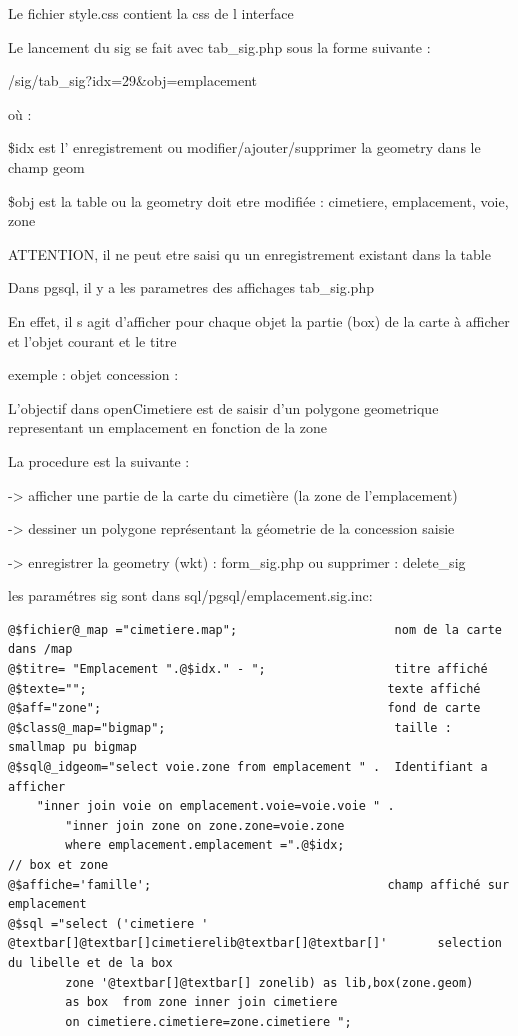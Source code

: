 \documentclass[letterpaper,10pt,french]{manual}
\begin{document}
Le fichier style.css contient la css de l interface

Le lancement du sig se fait avec tab\_sig.php sous la forme suivante :

/sig/tab\_sig?idx=29\&obj=emplacement

où :

\$idx est l' enregistrement ou modifier/ajouter/supprimer la geometry  dans le champ geom

\$obj est la table ou la geometry doit etre modifiée : cimetiere, emplacement, voie, zone

ATTENTION, il ne peut etre saisi qu un enregistrement existant dans la table

Dans pgsql, il y a les parametres des affichages tab\_sig.php

En effet, il s agit d'afficher pour chaque objet la partie (box) de la carte à afficher et
l'objet courant et le titre

exemple : objet concession :

L'objectif dans openCimetiere est de saisir d'un polygone geometrique
representant un emplacement en fonction de la zone

La procedure est la suivante :

-\textgreater{} afficher une partie de la carte du cimetière (la zone de l'emplacement)

-\textgreater{} dessiner un polygone représentant la géometrie de la concession saisie

-\textgreater{} enregistrer la geometry (wkt) : form\_sig.php ou supprimer : delete\_sig

les paramétres sig sont dans sql/pgsql/emplacement.sig.inc:

\begin{Verbatim}[commandchars=@\[\]]
@$fichier@_map ="cimetiere.map";                      nom de la carte dans /map
@$titre= "Emplacement ".@$idx." - ";                  titre affiché
@$texte="";                                          texte affiché
@$aff="zone";                                        fond de carte
@$class@_map="bigmap";                                taille : smallmap pu bigmap
@$sql@_idgeom="select voie.zone from emplacement " .  Identifiant a afficher
    "inner join voie on emplacement.voie=voie.voie " .
        "inner join zone on zone.zone=voie.zone
        where emplacement.emplacement =".@$idx;
// box et zone
@$affiche='famille';                                 champ affiché sur  emplacement
@$sql ="select ('cimetiere ' @textbar[]@textbar[]cimetierelib@textbar[]@textbar[]'       selection du libelle et de la box
        zone '@textbar[]@textbar[] zonelib) as lib,box(zone.geom)
        as box  from zone inner join cimetiere
        on cimetiere.cimetiere=zone.cimetiere ";
\end{Verbatim}
\end{document}
